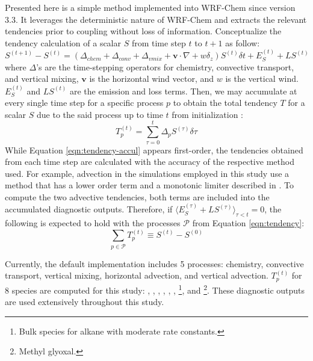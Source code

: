 	Presented here is a simple method implemented into WRF-Chem since version 3.3. It leverages the deterministic nature of WRF-Chem and extracts the relevant tendencies prior to coupling without loss of information. Conceptualize the tendency calculation of a scalar $S$ from time step $t$ to $t+1$ as follow:
	\begin{equation}\label{eqn:tendency}
		S^{(t+1)}-S^{(t)} = (\Delta_{chem}+\Delta_{conv}+\Delta_{vmix}+\mathbf{v}\cdot\nabla + w\delta_z)S^{(t)}\delta t + E_S^{(t)} + LS^{(t)}
	\end{equation}
	where $\Delta$'s are the time-stepping operators for chemistry, convective transport, and vertical mixing, $\mathbf{v}$ is the horizontal wind vector, and $w$ is the vertical wind. $E_S^{(t)}$ and $LS^{(t)}$ are the emission and loss terms. Then, we may accumulate at every single time step for a specific process $p$ to obtain the total tendency $T$ for a scalar $S$ due to the said process up to time $t$ from initialization :
	\begin{equation}\label{eqn:tendency-accul}
		T_{p}^{(t)} = \sum_{\tau=0}^t\Delta_{p} S^{(\tau)}\delta\tau
	\end{equation}
	While Equation \ref{eqn:tendency-accul} appears first-order, the tendencies obtained from each time step are calculated with the accuracy of the respective method used. For example, advection in the simulations employed in this study use a method that has a lower order term and a monotonic limiter described in \citet{Skamarock:2006wm}. To compute the two advective tendencies, both terms are included into the accumulated diagnostic outputs. Therefore,  if $\langle E_S^{(\tau)}+LS^{(\tau)}\rangle_{\tau<t}=0$, the following is expected to hold with the processes $\mathcal{P}$ from Equation \ref{eqn:tendency}:
	\begin{equation}\label{eqn:tendency-good}
		\sum_{p\in\mathcal{P}}T_{p}^{(t)} \equiv S^{(t)}-S^{(0)}
	\end{equation}
	
	Currently, the default implementation includes 5 processes: chemistry, convective transport, vertical mixing, horizontal advection, and vertical advection. $T_{p}^{(t)}$ for 8 species are computed for this study: , , , , , , \footnote{Bulk species for alkane with moderate  rate constants.}, and \footnote{Methyl glyoxal.}. These diagnostic outputs are used extensively throughout this study.
	
